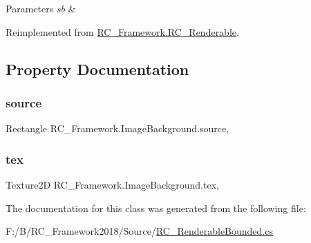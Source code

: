 \begin{DoxyParams}{Parameters}
{\em sb} & \\
\hline
\end{DoxyParams}


Reimplemented from \mbox{\hyperlink{class_r_c___framework_1_1_r_c___renderable_acc26db34e382a25a989c4c0dd0354b23}{R\+C\+\_\+\+Framework.\+R\+C\+\_\+\+Renderable}}.



\subsection{Property Documentation}
\mbox{\label{class_r_c___framework_1_1_image_background_a58fe22eaa5ab35456cd3a1d8c4b06295}} 
\subsubsection{\texorpdfstring{source}{source}}
{\footnotesize\ttfamily Rectangle R\+C\+\_\+\+Framework.\+Image\+Background.\+source\hspace{0.3cm}{\ttfamily [get]}, {\ttfamily [set]}}

\mbox{\label{class_r_c___framework_1_1_image_background_acbae55d0eec7e9db3b3dd1e6adcbd01e}} 
\subsubsection{\texorpdfstring{tex}{tex}}
{\footnotesize\ttfamily Texture2D R\+C\+\_\+\+Framework.\+Image\+Background.\+tex\hspace{0.3cm}{\ttfamily [get]}, {\ttfamily [set]}}



The documentation for this class was generated from the following file\+:\begin{DoxyCompactItemize}
\item 
F\+:/\+B/\+R\+C\+\_\+\+Framework2018/\+Source/\mbox{\hyperlink{_r_c___renderable_bounded_8cs}{R\+C\+\_\+\+Renderable\+Bounded.\+cs}}\end{DoxyCompactItemize}

